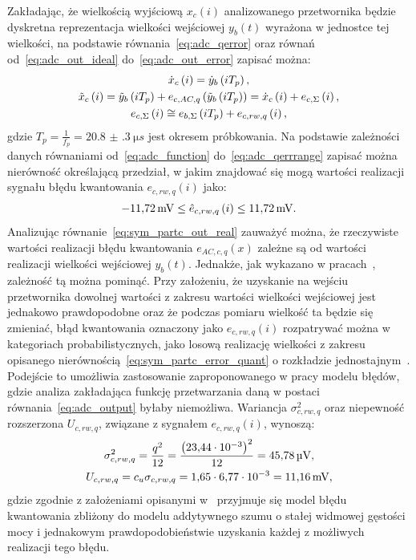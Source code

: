Zakładając, że wielkością wyjściową $x_{c}(i)$ analizowanego przetwornika będzie dyskretna reprezentacja wielkości wejściowej $y_{b}(t)$ wyrażona w jednostce tej wielkości, na podstawie równania~\eqref{eq:adc_qerror} oraz równań od~\eqref{eq:adc_out_ideal} do~\eqref{eq:adc_out_error} zapisać można:
\begin{gather}
\dot{x}_{c} \left(i\right) = \dot{y}_{b} \left(iT_{p}\right) \label{eq:sym_partc_out_ideal}, \\
\tilde{x}_{c} \left(i\right) = \tilde{y}_{b} \left(iT_{p}\right) + e_{c,AC,q} \left( \tilde{y}_{b} \left(iT_{p}\right) \right) = \dot{x}_{c} \left(i\right) + e_{c,\Sigma} \left(i\right) \label{eq:sym_partc_out_real}, \\
e_{c,\Sigma} \left(i\right) \cong e_{b,\Sigma} \left(iT_{p}\right) + e_{c,rw,q} \left(i\right) \label{eq:sym_partc_error_sum},
\end{gather}
gdzie $T_{p} = \frac{1}{f_{p}} = \qty{20.8(3)}{\micro s}$ jest okresem próbkowania. Na podstawie zależności danych równaniami od~\eqref{eq:adc_function} do~\eqref{eq:adc_qerrrange} zapisać można nierówność określającą przedział, w jakim znajdować się mogą wartości realizacji sygnału błędu kwantowania $e_{c,rw,q}(i)$ jako:
\begin{equation}
\qty{-11.72}{mV} \le \hat{e}_{c,rw,q} \left(i\right) \le \qty{11.72}{mV} \label{eq:sym_partc_error_quant}.
\end{equation}
Analizując równanie~\eqref{eq:sym_partc_out_real} zauważyć można, że rzeczywiste wartości realizacji błędu kwantowania $e_{AC,c,q}(x)$ zależne są od wartości realizacji wielkości wejściowej $y_{b}(t)$. Jednakże, jak wykazano w pracach~\cite{sienkowski_kwant, sienkowski_adc}, zależność tą można pominąć. Przy założeniu, że uzyskanie na wejściu przetwornika dowolnej wartości z zakresu wartości wielkości wejściowej jest jednakowo prawdopodobne oraz że podczas pomiaru wielkość ta będzie się zmieniać, błąd kwantowania oznaczony jako $e_{c,rw,q}(i)$ rozpatrywać można w kategoriach probabilistycznych, jako losową realizację wielkości z zakresu opisanego nierównością~\eqref{eq:sym_partc_error_quant} o rozkładzie jednostajnym~\cite{jakubiec_system}. Podejście to umożliwia zastosowanie zaproponowanego w pracy modelu błędów, gdzie analiza zakładająca funkcję przetwarzania daną w postaci równania~\eqref{eq:adc_output} byłaby niemożliwa. Wariancja $\sigma_{c,rw,q}^{2}$ oraz niepewność rozszerzona $U_{c,rw,q}$, związane z sygnałem $e_{c,rw,q}(i)$, wynoszą:
\begin{gather}
\sigma_{c,rw,q}^{2} = \frac{ q^{2}}{12} = \frac{\left(\num{23.44e-3}\right)^{2} }{12} = \qty{45.78}{\micro V} \label{eq:sym_partc_var_quant}, \\
U_{c,rw,q} = c_{u} \sigma_{c,rw,q} = \num{1.65} \cdot \num{6.77e-3} = \qty{11.16}{mV} \label{eq:sym_partc_uncert_quant},
\end{gather}
gdzie zgodnie z założeniami opisanymi w~\cite{gray_quantization, widrow_quantization} przyjmuje się model błędu kwantowania zbliżony do modelu addytywnego szumu o stałej widmowej gęstości mocy i jednakowym prawdopodobieństwie uzyskania każdej z możliwych realizacji tego błędu.

